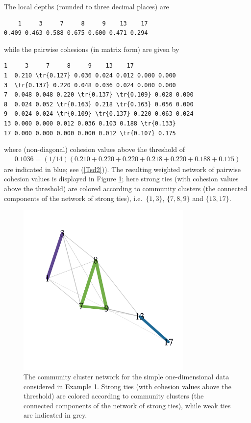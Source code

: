 \noindent The local depths (rounded to three decimal places) are

\begin{verbatim}
    1     3     7     8     9    13    17
0.409 0.463 0.588 0.675 0.600 0.471 0.294
\end{verbatim}

\noindent while the pairwise cohesions (in matrix form) are given by

\begin{Verbatim}[commandchars=\\\{\}]
       1     3     7     8     9    13    17
1  0.210 \tr{0.127} 0.036 0.024 0.012 0.000 0.000
3  \tr{0.137} 0.220 0.048 0.036 0.024 0.000 0.000
7  0.048 0.048 0.220 \tr{0.137} \tr{0.109} 0.028 0.000
8  0.024 0.052 \tr{0.163} 0.218 \tr{0.163} 0.056 0.000
9  0.024 0.024 \tr{0.109} \tr{0.137} 0.220 0.063 0.024
13 0.000 0.000 0.012 0.036 0.103 0.188 \tr{0.133}
17 0.000 0.000 0.000 0.000 0.012 \tr{0.107} 0.175
\end{Verbatim}

\noindent where (non-diagonal) cohesion values above the threshold of
\begin{eqnarray}
0.1036=(1/14) (0.210+0.220+0.220+0.218+0.220+0.188+0.175)
\end{eqnarray}
\noindent are indicated in blue; see (\ref{Tsd2})). The resulting weighted network of pairwise cohesion values is displayed in Figure \ref{fig:figsimple}; here strong ties (with cohesion values above the threshold) are colored according to community clusters (the connected components of the network of strong ties), i.e.~\(\{1,3\}\), \(\{7,8,9\}\) and \(\{13,17\}\).

\begin{figure}[H]
    \centering
\includegraphics[width=3.4in,trim=.2in .4in .2in .4in,clip]{pald-2}

\caption{The community cluster network for the simple one-dimensional data considered in Example 1. Strong ties (with cohesion values above the threshold) are colored according to community clusters (the connected components of the network of strong ties), while weak ties are indicated in grey.}\label{fig:figsimple}
\end{figure}

